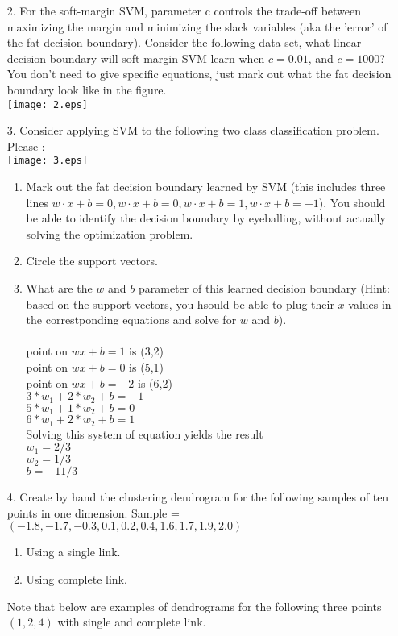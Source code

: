 \documentclass[12pt,letterpaper]{article}
\begin{document}
\begin{enumerate}
	\item[2.] For the soft-margin SVM, parameter c controls the trade-off between maximizing the margin and minimizing the slack variables (aka the 'error' of the fat decision boundary). Consider the following data set, what linear decision boundary will soft-margin SVM learn when $c = 0.01$, and $c = 1000$? You don't need to give specific equations, just mark out what the fat decision boundary look like in the figure. \\
	\texttt{[image: 2.eps]}
    \pagebreak
	\item[3.] Consider applying SVM to the following two class classification problem. Please : \\
	\texttt{[image: 3.eps]}
	\begin{enumerate} 
		\item Mark out the fat decision boundary learned by SVM (this includes three lines $w\cdot x+b=0, w\cdot x+b=0, w\cdot x+b=1, w\cdot x+b=-1$). You should be able to identify the decision boundary by eyeballing, without actually solving the optimization problem. \\
		\item Circle the support vectors. \\
		\item What are the $w$ and $b$ parameter of this learned decision boundary (Hint: based on the support vectors, you hsould be able to plug their $x$ values in the correstponding equations and solve for $w$ and $b$). \\ \\
        point on $wx + b = 1$ is (3,2) \\
        point on $wx + b = 0$ is (5,1) \\
        point on $wx + b = -2$ is (6,2) \\
        $3*w_{1} + 2*w_{2} + b = -1$ \\
        $5*w_{1} + 1*w_{2} + b = 0$  \\
        $6*w_{1} + 2*w_{2} + b = 1$ \\
        Solving this system of equation yields the result \\
        $w_{1} = 2/3$ \\
        $w_{2} = 1/3$ \\
        $b = -11/3$ \\
	\end{enumerate}
	\item[4.] Create by hand the clustering dendrogram for the following samples of ten points in one dimension. Sample = $(-1.8, -1.7, -0.3, 0.1, 0.2, 0.4, 1.6, 1.7, 1.9, 2.0)$ 
	\begin{enumerate} 
		\item Using a single link. \\
		\item Using complete link. \\
	\end{enumerate} 
	Note that below are examples of dendrograms for the following three points $(1,2,4)$ with single and complete link. \\



\end{enumerate} 
\end{document}
